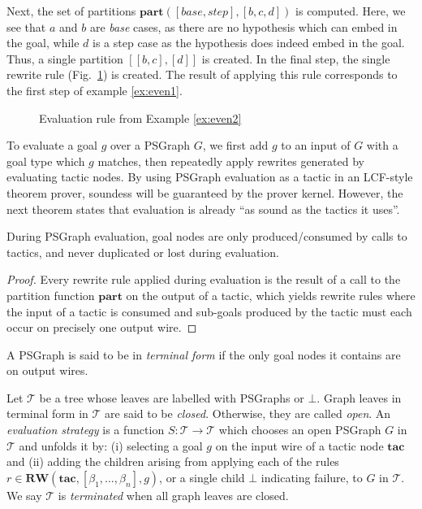 \documentclass{llncs}
\begin{document}
\noindent Next, the set of partitions $\textbf{part}([base,step],[b,c,d])$ is computed. Here, we see that $a$ and $b$ are \textit{base}
cases, as there are no hypothesis which can embed in the goal, while $d$ is a step case as the hypothesis does indeed embed 
in the goal. Thus, a single partition $[[b,c],[d]]$ is created. In the final step, the single rewrite rule (Fig.~\ref{fig:eval-ex}) is created. The result of applying this rule corresponds to the first step of example \ref{ex:even1}.

\begin{figure}\centering
  \vspace{-20pt}
  \caption{Evaluation rule from Example \ref{ex:even2}}\label{fig:eval-ex}
  \vspace{-10pt}
\end{figure}

To evaluate a goal $g$ over a PSGraph $G$, we first add $g$ to an input of $G$ with a goal type which $g$ matches, then repeatedly apply rewrites generated by evaluating tactic nodes. By using PSGraph evaluation as a tactic in an LCF-style theorem prover, soundess will be guaranteed by the prover kernel. However, the next theorem states that evaluation is already ``as sound as the tactics it uses''.

\begin{theorem}[Soundness] \label{thm:soundness}
During PSGraph evaluation, goal nodes are only produced/consumed by calls to tactics, and never duplicated or lost during evaluation.
\end{theorem}

\begin{proof}
  Every rewrite rule applied during evaluation is the result of a call to the partition function $\textbf{part}$ on the output of a tactic, which yields rewrite rules where the input of a tactic is consumed and sub-goals produced by the tactic must each occur on precisely one output wire.
\end{proof}


\begin{definition} \rm
A PSGraph is said to be in \emph{terminal form} if the only goal nodes it contains are on output wires. 
\end{definition}

\begin{definition} \rm
Let $\mathcal T$ be a tree whose leaves are labelled with PSGraphs or $\bot$. Graph leaves in terminal form in $\mathcal T$ are said to be \textit{closed}. Otherwise, they are called \textit{open}. An \emph{evaluation strategy} is a function $S : \mathcal T \to \mathcal T$ which chooses an open PSGraph $G$ in $\mathcal T$ and unfolds it by: (i) selecting a goal $g$ on the input wire of a tactic node $\textbf{tac}$ and (ii) adding
the children arising from applying each of the rules $r \in \textbf{RW}(\textbf{tac}, [\beta_1,\dots,\beta_n], g)$, or a single child $\bot$ indicating failure, to $G$ in $\mathcal T$. We say $\mathcal{T}$ is \emph{terminated} when all graph leaves are closed.
\end{definition}
\end{document}
